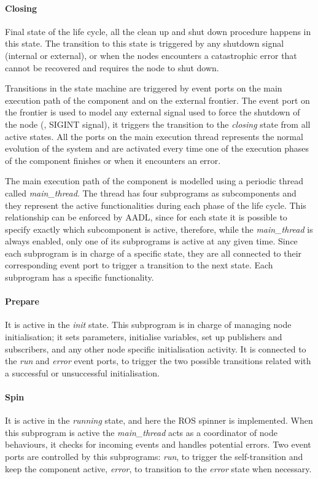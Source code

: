\paragraph{Closing} Final state of the life cycle, all the clean up and shut down procedure happens in this state. The transition to this state is triggered by any shutdown signal (internal or external), or when the nodes encounters a catastrophic error that cannot be recovered and requires the node to shut down.
\medskip

Transitions in the state machine are triggered by event ports on the main execution path of the component and on the external frontier. The event port on the frontier is used to model any external signal used to force the shutdown of the node (\eg, SIGINT signal), it triggers the transition to the \textit{closing} state from all active states. All the ports on the main execution thread represents the normal evolution of the system and are activated every time one of the execution phases of the component finishes or when it encounters an error.

The main execution path of the component is modelled using a periodic thread called \textit{main\_thread}. The thread has four subprograms as subcomponents and they represent the active functionalities during each phase of the life cycle. This relationship can be enforced by AADL, since for each state it is possible to specify exactly which subcomponent is active, therefore, while the \textit{main\_thread} is always enabled, only one of its subprograms is active at any given time. Since each subprogram is in charge of a specific state, they are all connected to their corresponding event port to trigger a transition to the next state. Each subprogram has a specific functionality.

\paragraph{Prepare} It is active in the \textit{init} state. This subprogram is in charge of managing node initialisation; it sets parameters, initialise variables, set up publishers and subscribers, and any other node specific initialisation activity. It is connected to the \textit{run} and \textit{error} event ports, to trigger the two possible transitions related with a successful or unsuccessful initialisation.
\paragraph{Spin} It is active in the \textit{running} state, and here the ROS spinner is implemented. When this subprogram is active the \textit{main\_thread} acts as a coordinator of node behaviours, it checks for incoming events and handles potential errors. Two event ports are controlled by this subprograms: \textit{run}, to trigger the self-transition and keep the component active, \textit{error}, to transition to the \textit{error} state when necessary.
